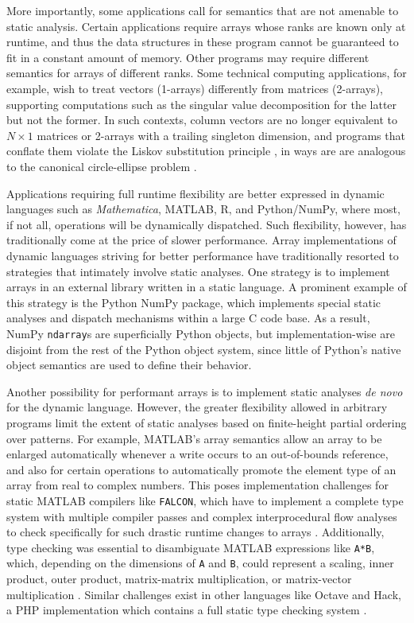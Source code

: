 \documentclass[preprint]{sigplanconf}
\newcommand{\MATLAB}{\textsc{MATLAB}}
\newcommand{\Mathematica}{\textit{Mathematica}}
\newcommand{\code}[1]{\texttt{#1}}
\begin{document}
More importantly, some applications call for semantics that are not amenable
to static analysis. Certain applications require arrays whose ranks are known
only at runtime, and thus the data structures in these program cannot be
guaranteed to fit in a constant amount of memory. Other programs may require
different semantics for arrays of different ranks. Some technical computing
applications, for example, wish to treat vectors (1-arrays) differently from
matrices (2-arrays), supporting computations such as the singular value
decomposition for the latter but not the former. In such contexts, column
vectors are no longer equivalent to $N\times1$ matrices or 2-arrays with a
trailing singleton dimension, and programs that conflate them violate the
Liskov substitution principle \cite{Liskov:1987da}, in ways are are analogous
to the canonical circle-ellipse problem \cite{Halbert:1987ut}.

Applications requiring full runtime flexibility are better expressed in
dynamic languages such as \Mathematica, \MATLAB, R, and Python/NumPy, where
most, if not all, operations will be dynamically dispatched. Such flexibility,
however, has traditionally come at the price of slower performance.
Array implementations of dynamic languages striving for better performance have
traditionally resorted to strategies that intimately involve static analyses. One strategy is to implement arrays in an external library
written in a static language. A prominent example of this strategy is the
Python NumPy package, which implements special static analyses and dispatch
mechanisms within a large C code base. As a result, NumPy \code{ndarray}s are
superficially Python objects, but implementation-wise are disjoint from the
rest of the Python object system, since little of Python's native object
semantics are used to define their behavior.

Another possibility for performant arrays is to implement static analyses
\textit{de novo} for the dynamic language. However, the greater flexibility
allowed in arbitrary programs limit the extent of static analyses based on
finite-height partial ordering over patterns. For example, \MATLAB's array
semantics allow an array to be enlarged automatically whenever a write occurs
to an out-of-bounds reference, and also for certain operations to
automatically promote the element type of an array from real to complex
numbers. This poses implementation challenges for static \MATLAB{} compilers
like \code{FALCON}, which have to implement a complete type system with
multiple compiler passes and complex interprocedural flow analyses to check
specifically for such drastic runtime changes to arrays \cite{Rose:1999tt,
Li:2013mf}. Additionally, type checking was essential to disambiguate
\MATLAB{} expressions like \code{A*B}, which, depending on the dimensions of
\code{A} and \code{B}, could represent a scaling, inner product, outer
product, matrix-matrix multiplication, or matrix-vector multiplication
\cite{Rose:1999tt}. Similar challenges exist in other languages like Octave
\cite{Eaton:2001op} and Hack, a PHP implementation which contains a full
static type checking system \cite{Verlaguet:2014hn}.
\end{document}
